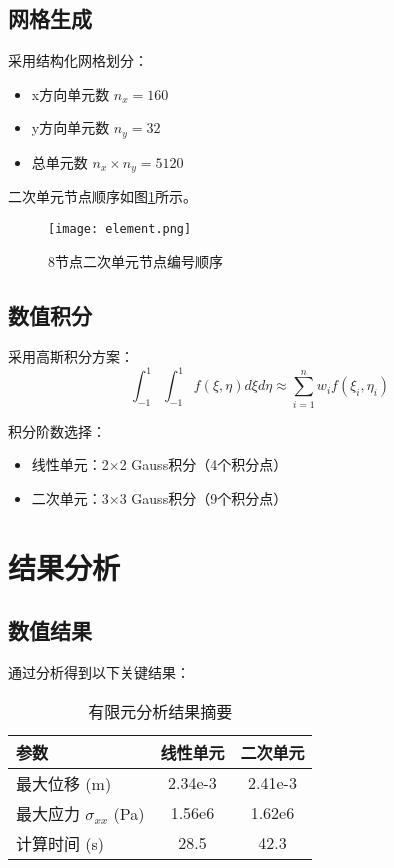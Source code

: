 \documentclass[a4paper,12pt]{article}
\begin{document}
\subsection{网格生成}
采用结构化网格划分：
\begin{itemize}
\item x方向单元数 $n_x = 160$
\item y方向单元数 $n_y = 32$
\item 总单元数 $n_x \times n_y = 5120$
\end{itemize}

二次单元节点顺序如图\ref{fig:element}所示。
\begin{figure}[htbp]
\centering
\texttt{[image: element.png]}
\caption{8节点二次单元节点编号顺序}
\label{fig:element}
\end{figure}

\subsection{数值积分}
采用高斯积分方案：
\begin{equation}
\int_{-1}^1 \int_{-1}^1 f(\xi,\eta) d\xi d\eta \approx \sum_{i=1}^{n} w_i f(\xi_i,\eta_i)
\end{equation}

积分阶数选择：
\begin{itemize}
\item 线性单元：2×2 Gauss积分（4个积分点）
\item 二次单元：3×3 Gauss积分（9个积分点）
\end{itemize}

\section{结果分析}
\subsection{数值结果}
通过分析得到以下关键结果：

\begin{table}[htbp]
\centering
\caption{有限元分析结果摘要}
\begin{tabular}{lcc}
\toprule
参数 & 线性单元 & 二次单元 \\
\midrule
最大位移 (m) & 2.34e-3 & 2.41e-3 \\
最大应力 $\sigma_{xx}$ (Pa) & 1.56e6 & 1.62e6 \\
计算时间 (s) & 28.5 & 42.3 \\
\bottomrule
\end{tabular}
\label{tab:results}
\end{table}
\end{document}
